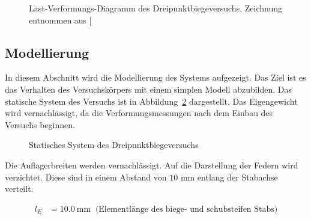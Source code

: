 \documentclass[
  11pt,
  letterpaper,
]{scrreprt}
\begin{document}
\begin{figure}[H]


\caption{\label{fig-last_verformung_a3v2}Last-Verformungs-Diagramm des
Dreipunktbiegeversuchs, Zeichnung entnommen aus
{[}\citeproc{ref-jager_versuche_2006}{2}{]}}

\end{figure}%

\subsection{Modellierung}\label{modellierung}

In diesem Abschnitt wird die Modellierung des Systems aufgezeigt. Das
Ziel ist es das Verhalten des Versuchskörpers mit einem simplen Modell
abzubilden. Das statische System des Versuchs ist in
Abbildung~\ref{fig-system_a3v2} dargestellt. Das Eigengewicht wird
vernachlässigt, da die Verformungsmessungen nach dem Einbau des Versuchs
beginnen.

\begin{figure}[H]


\caption{\label{fig-system_a3v2}Statisches System des
Dreipunktbiegeversuchs}

\end{figure}%

Die Auflagerbreiten werden vernachlässigt. Auf die Darstellung der
Federn wird verzichtet. Diese sind in einem Abstand von \(10\) mm
entlang der Stabachse verteilt.

$$
\begin{aligned}
l_{E} &= 10.0\ \mathrm{mm} \; \;\textrm{(Elementlänge des biege- und schubsteifen Stabs)}
\end{aligned}
$$
\end{document}
